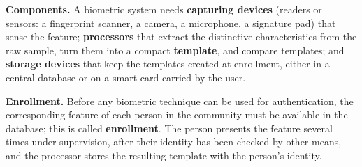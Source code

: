 \textbf{Components.} A biometric system needs \textbf{capturing devices} (readers or sensors: a fingerprint scanner, a camera, a microphone, a signature pad) that sense the feature; \textbf{processors} that extract the distinctive characteristics from the raw sample, turn them into a compact \textbf{template}, and compare templates; and \textbf{storage devices} that keep the templates created at enrollment, either in a central database or on a smart card carried by the user.

\textbf{Enrollment.} Before any biometric technique can be used for authentication, the corresponding feature of each person in the community must be available in the database; this is called \textbf{enrollment}. The person presents the feature several times under supervision, after their identity has been checked by other means, and the processor stores the resulting template with the person's identity.

